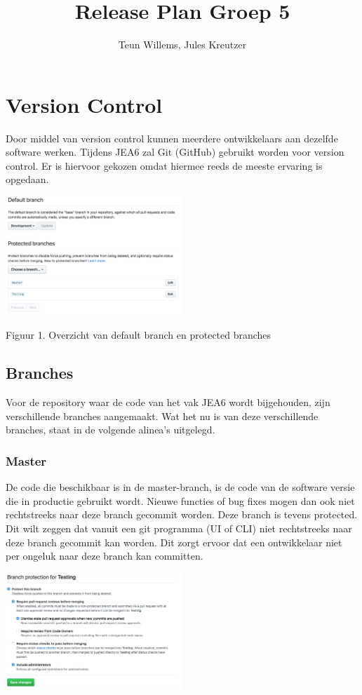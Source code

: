 \documentclass{article}
\title{Release Plan Groep 5}
\author{Teun Willems, Jules Kreutzer}
\begin{document}
	\maketitle
	
	\newpage
	
	\section{Version Control}
	Door middel van version control kunnen meerdere ontwikkelaars aan dezelfde software werken.
	Tijdens JEA6 zal Git (GitHub) gebruikt worden voor version control. Er is hiervoor gekozen omdat hiermee reeds de meeste ervaring is opgedaan.
	
	\includegraphics[width=0.50\textwidth]{images/configuredBranches.png}
	
	Figuur 1. Overzicht van default branch en protected branches
	
	\subsection{Branches}
	Voor de repository waar de code van het vak JEA6 wordt bijgehouden, zijn verschillende branches aangemaakt. Wat het nu is van deze verschillende branches, staat in de volgende alinea's uitgelegd.
	
	\subsubsection{Master}
	De code die beschikbaar is in de master-branch, is de code van de software versie die in productie gebruikt wordt. Nieuwe functies of bug fixes mogen dan ook niet rechtstreeks naar deze branch gecommit worden.
	Deze branch is tevens protected. Dit wilt zeggen dat vanuit een git programma (UI of CLI) niet rechtstreeks naar deze branch gecommit kan worden. Dit zorgt ervoor dat een ontwikkelaar niet per ongeluk naar deze branch kan committen.
	
	\includegraphics[width=0.5\textwidth]{images/BranchProtectionSetup.png}
	
\end{document}

